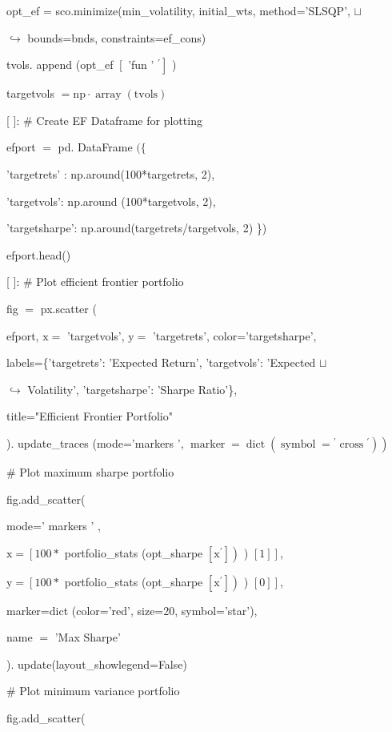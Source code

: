 \documentclass[10pt]{article}
\begin{document}
opt\_ef = sco.minimize(min\_volatility, initial\_wts, method='SLSQP', $\sqcup$

$\hookrightarrow$ bounds=bnds, constraints=ef\_cons)

tvols. append (opt\_ef $\left[\right.$ 'fun ' $\left.^{\prime}\right]$ )

targetvols $=\mathrm{np} \cdot \operatorname{array}(\mathrm{tvols})$

[ ]: \# Create EF Dataframe for plotting

efport $=$ pd. DataFrame $(\{$

'targetrets' : np.around(100*targetrets, 2),

'targetvols': np.around (100*targetvols, 2),

'targetsharpe': np.around(targetrets/targetvols, 2) \})

efport.head()

[ ]: \# Plot efficient frontier portfolio

fig $=$ px.scatter (

efport, $\mathrm{x}=$ 'targetvols', $\mathrm{y}=$ 'targetrets', color='targetsharpe',

labels=\{'targetrets': 'Expected Return', 'targetvols': 'Expected $\sqcup$

$\hookrightarrow$ Volatility', 'targetsharpe': 'Sharpe Ratio'\},

title="Efficient Frontier Portfolio"

). update\_traces (mode='markers ', $\left.\operatorname{marker}=\operatorname{dict}\left(\operatorname{symbol}={ }^{\prime} \operatorname{cross}{ }^{\prime}\right)\right)$

\# Plot maximum sharpe portfolio

fig.add\_scatter(

mode=' markers ' ,

$\mathrm{x}=\left[100 *\right.$ portfolio\_stats (opt\_sharpe $\left.\left[\mathrm{x}^{\prime}\right]\right)$ ) $\left.[1]\right]$,

$\mathrm{y}=\left[100 *\right.$ portfolio\_stats (opt\_sharpe $\left.\left[\mathrm{x}^{\prime}\right]\right)$ ) $\left.[0]\right]$,

marker=dict (color='red', size=20, symbol='star'),

name $=$ 'Max Sharpe'

). update(layout\_showlegend=False)

\# Plot minimum variance portfolio

fig.add\_scatter(
\end{document}
